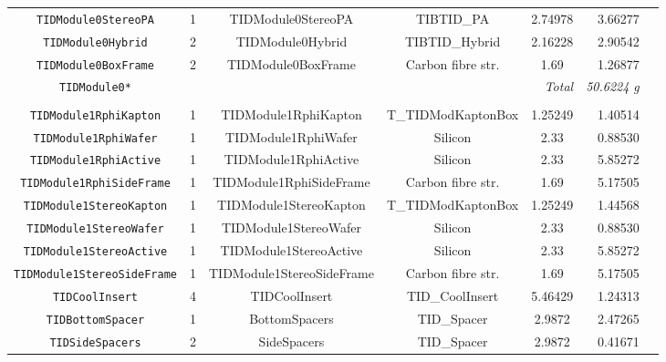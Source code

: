 \documentclass{cmspaper}
\begin{document}
\begin{sidewaystable}[p]
\begin{center}
\begin{tabular}{cccccrr}
         {\tt TIDModule0StereoPA}           & 1     & TIDModule0StereoPA            & TIBTID\_PA            & 2.74978       & 3.66277   &   \\
         {\tt TIDModule0Hybrid}             & 2     & TIDModule0Hybrid              & TIBTID\_Hybrid        & 2.16228       & 2.90542   &   \\
         {\tt TIDModule0BoxFrame}           & 2     & TIDModule0BoxFrame            & Carbon fibre str.     & 1.69          & 1.26877   &   \\
	 {\tt TIDModule0*}             &  \multicolumn{4}{r}{\em Total } & {\em  50.6224 g} & \\
	 \hline  \\
	 {\tt TIDModule1RphiKapton}         & 1     & TIDModule1RphiKapton          & T\_TIDModKaptonBox    & 1.25249       & 1.40514  &  \\
	 {\tt TIDModule1RphiWafer}          & 1     & TIDModule1RphiWafer           & Silicon               & 2.33          & 0.88530  &  \\
	 {\tt TIDModule1RphiActive}         & 1     & TIDModule1RphiActive          & Silicon               & 2.33          & 5.85272  &  \\
	 {\tt TIDModule1RphiSideFrame}      & 1     & TIDModule1RphiSideFrame       & Carbon fibre str.     & 1.69          & 5.17505  &  \\
	 {\tt TIDModule1StereoKapton}       & 1     & TIDModule1StereoKapton        & T\_TIDModKaptonBox    & 1.25249       & 1.44568  &  \\
	 {\tt TIDModule1StereoWafer}        & 1     & TIDModule1StereoWafer         & Silicon               & 2.33          & 0.88530  &  \\
	 {\tt TIDModule1StereoActive}       & 1     & TIDModule1StereoActive        & Silicon               & 2.33          & 5.85272  &  \\
	 {\tt TIDModule1StereoSideFrame}    & 1     & TIDModule1StereoSideFrame     & Carbon fibre str.     & 1.69          & 5.17505  &  \\
	 {\tt TIDCoolInsert}                & 4     & TIDCoolInsert                 & TID\_CoolInsert       & 5.46429       & 1.24313  &  \\
	 {\tt TIDBottomSpacer}              & 1     & BottomSpacers                 & TID\_Spacer           & 2.9872        & 2.47265  &  \\
	 {\tt TIDSideSpacers}               & 2     & SideSpacers                   & TID\_Spacer           & 2.9872        & 0.41671  &  \\

\end{tabular}
\end{center}
\end{sidewaystable}
\end{document}
